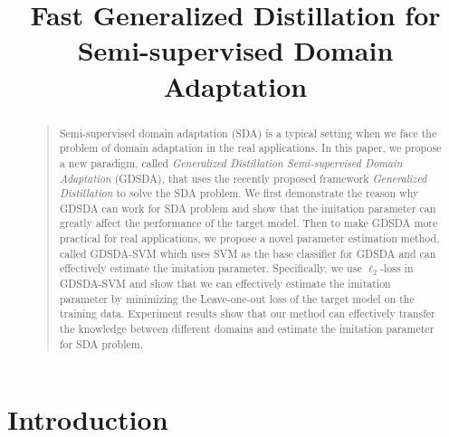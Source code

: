 \documentclass[letterpaper]{article}
\begin{document}
%
\title{Fast Generalized Distillation for Semi-supervised Domain Adaptation}
\maketitle
\begin{abstract}
\begin{quote}

Semi-supervised domain adaptation (SDA) is a typical setting when we face the problem of domain adaptation in the real applications. In this paper, we propose a new paradigm, called \textit{Generalized Distillation Semi-supervised Domain Adaptation} (GDSDA), that uses the recently proposed framework \textit{Generalized Distillation} \cite{lopez2015unifying} to solve the SDA problem.
We first demonstrate the reason why GDSDA can work for SDA problem and show that the imitation parameter can greatly affect the performance of the target model. Then to make GDSDA more practical for real applications, we propose a novel parameter estimation method, called GDSDA-SVM which uses SVM as the base classifier for GDSDA and can effectively estimate the imitation parameter. Specifically, we use $\ell_2$-loss in GDSDA-SVM and show that we can effectively estimate the imitation parameter by minimizing the Leave-one-out loss of the target model on the training data. Experiment results show that our method can effectively transfer the knowledge between different domains and estimate the imitation parameter for SDA problem.
\end{quote}
\end{abstract}

\section{Introduction}


%

%
\end{document}
